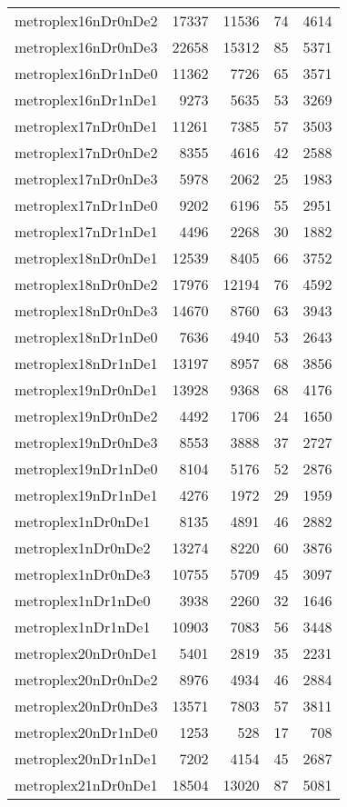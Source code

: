 \begin{longtable}{lrrrr}
metroplex16nDr0nDe2 & 17337 & 11536 & 74 & 4614 \\
metroplex16nDr0nDe3 & 22658 & 15312 & 85 & 5371 \\
metroplex16nDr1nDe0 & 11362 & 7726 & 65 & 3571 \\
metroplex16nDr1nDe1 & 9273 & 5635 & 53 & 3269 \\
metroplex17nDr0nDe1 & 11261 & 7385 & 57 & 3503 \\
metroplex17nDr0nDe2 & 8355 & 4616 & 42 & 2588 \\
metroplex17nDr0nDe3 & 5978 & 2062 & 25 & 1983 \\
metroplex17nDr1nDe0 & 9202 & 6196 & 55 & 2951 \\
metroplex17nDr1nDe1 & 4496 & 2268 & 30 & 1882 \\
metroplex18nDr0nDe1 & 12539 & 8405 & 66 & 3752 \\
metroplex18nDr0nDe2 & 17976 & 12194 & 76 & 4592 \\
metroplex18nDr0nDe3 & 14670 & 8760 & 63 & 3943 \\
metroplex18nDr1nDe0 & 7636 & 4940 & 53 & 2643 \\
metroplex18nDr1nDe1 & 13197 & 8957 & 68 & 3856 \\
metroplex19nDr0nDe1 & 13928 & 9368 & 68 & 4176 \\
metroplex19nDr0nDe2 & 4492 & 1706 & 24 & 1650 \\
metroplex19nDr0nDe3 & 8553 & 3888 & 37 & 2727 \\
metroplex19nDr1nDe0 & 8104 & 5176 & 52 & 2876 \\
metroplex19nDr1nDe1 & 4276 & 1972 & 29 & 1959 \\
metroplex1nDr0nDe1 & 8135 & 4891 & 46 & 2882 \\
metroplex1nDr0nDe2 & 13274 & 8220 & 60 & 3876 \\
metroplex1nDr0nDe3 & 10755 & 5709 & 45 & 3097 \\
metroplex1nDr1nDe0 & 3938 & 2260 & 32 & 1646 \\
metroplex1nDr1nDe1 & 10903 & 7083 & 56 & 3448 \\
metroplex20nDr0nDe1 & 5401 & 2819 & 35 & 2231 \\
metroplex20nDr0nDe2 & 8976 & 4934 & 46 & 2884 \\
metroplex20nDr0nDe3 & 13571 & 7803 & 57 & 3811 \\
metroplex20nDr1nDe0 & 1253 & 528 & 17 & 708 \\
metroplex20nDr1nDe1 & 7202 & 4154 & 45 & 2687 \\
metroplex21nDr0nDe1 & 18504 & 13020 & 87 & 5081 \\

\end{longtable}
